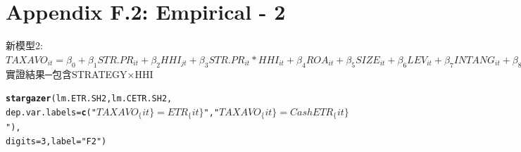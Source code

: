 \documentclass[a4paper]{article}\usepackage[]{graphicx}\usepackage[]{color}
\makeatletter
\newcommand{\hlnum}[1]{\textcolor[rgb]{0.686,0.059,0.569}{#1}}%
\newcommand{\hlstr}[1]{\textcolor[rgb]{0.192,0.494,0.8}{#1}}%
\newcommand{\hlstd}[1]{\textcolor[rgb]{0.345,0.345,0.345}{#1}}%
\newcommand{\hlkwc}[1]{\textcolor[rgb]{0.333,0.667,0.333}{#1}}%
\newcommand{\hlkwd}[1]{\textcolor[rgb]{0.737,0.353,0.396}{\textbf{#1}}}%
\newenvironment{kframe}{%
 \def\at@end@of@kframe{}%
 \ifinner\ifhmode%
  \def\at@end@of@kframe{\end{minipage}}%
  \begin{minipage}{\columnwidth}%
 \fi\fi%
 \def\FrameCommand##1{\hskip\@totalleftmargin \hskip-\fboxsep
 \colorbox{shadecolor}{##1}\hskip-\fboxsep
     \hskip-\linewidth \hskip-\@totalleftmargin \hskip\columnwidth}%
 \MakeFramed {\advance\hsize-\width
   \@totalleftmargin\z@ \linewidth\hsize
   \@setminipage}}%
 {\par\unskip\endMakeFramed%
 \at@end@of@kframe}
\makeatother
\begin{document}
\section{\\Appendix F.2: Empirical - 2} \label{App:Appendix F.2}
新模型2:\\
$TAXAVO_{it}=\beta_{0}+\beta_{1}STR.PR_{it}+\beta_{2}HHI_{jt}+\beta_{3}STR.PR_{it}*HHI_{it}+\beta_{4}ROA_{it}+\beta_{5}SIZE_{it}+\beta_{6}LEV_{it}+\beta_{7}INTANG_{it}+\beta_{8}QUICK_{it}+\beta_{9}EQINC_{it}+\beta_{10}OUTINSTI_{it}+\beta_{11}RELAT_{it}+\beta_{12}FAMILY_{it}+\beta_{13}GDP_{it}+\varepsilon_{14}$\\
實證結果─包含STRATEGY×HHI\\
\begin{kframe}
\begin{alltt}
  \hlkwd{stargazer}\hlstd{(lm.ETR.SH2,lm.CETR.SH2,}
    \hlkwc{dep.var.labels} \hlstd{=} \hlkwd{c}\hlstd{(}\hlstr{"$TAXAVO_\{it\}=ETR_\{it\}$"}\hlstd{,}\hlstr{"$TAXAVO_\{it\}=CashETR_\{it\}$"}\hlstd{),}
    \hlkwc{digits}\hlstd{=}\hlnum{3}\hlstd{,}\hlkwc{label} \hlstd{=} \hlstr{"F2"}\hlstd{)}
\end{alltt}
\end{kframe}
\end{document}
